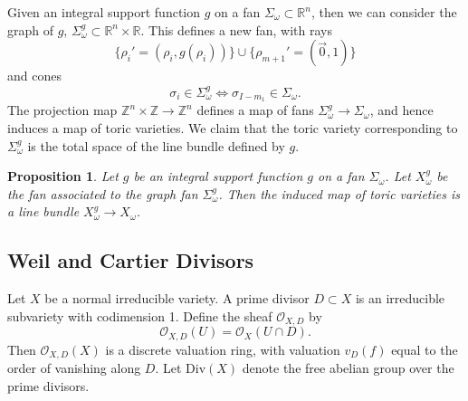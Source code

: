 \documentclass{article}
\newtheorem{prop}[theorem]{Proposition}
\theoremstyle{definition}
\theoremstyle{remark}
\numberwithin{theorem}{section}
\newcommand{\Z}{\mathbb{Z}}
\newcommand{\R}{\mathbb{R}}
\newcommand{\Div}{\mathrm{Div}}
\begin{document}
	Given an integral support function $g$ on a fan $\Sigma_\omega\subset \R^n$, then we can consider the graph of $g$, $\Sigma^g_\omega  \subset \R^n\times \R$. This defines a new fan, with rays $$\{\rho_i' = (\rho_i, g(\rho_i))\}\cup \{\rho_{m+1}'=(\vec{0},1)\}$$ and cones $$\sigma_i\in\Sigma^g_\omega \iff \sigma_{I-{m_1}} \in \Sigma_\omega.$$
	The projection map $\Z^n\times \Z \to \Z^n$ defines a map of fans $\Sigma_\omega^g\to \Sigma_\omega$, and hence induces a map of toric varieties. We claim that the toric variety corresponding to $\Sigma^g_\omega$ is the total space of the line bundle defined by $g$.
	\begin{prop}
		Let $g$ be an integral support function $g$ on a fan $\Sigma_\omega$. Let $X_\omega^g$ be the fan associated to the graph fan $\Sigma^g_\omega$. Then the induced map of toric varieties is a line bundle $X_{\omega}^g\to X_\omega$.
	\end{prop}

	\subsection{Weil and Cartier Divisors}
	Let $X$ be a normal irreducible variety. A prime divisor $D\subset X$ is an irreducible subvariety with codimension 1. Define the sheaf $\mathcal{O}_{X,D}$ by
	$$\mathcal{O}_{X,D}(U) = \mathcal{O}_X(U\cap D).$$
	Then $\mathcal{O}_{X,D}(X)$ is a discrete valuation ring, with valuation $v_D(f)$ equal to the order of vanishing along $D$. Let $\Div(X)$ denote the free abelian group over the prime divisors. 
\end{document}
